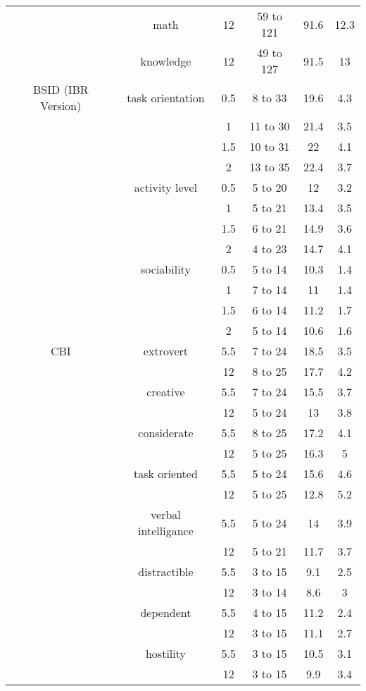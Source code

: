 \begin{ThreePartTable}
\begin{longtable}{c c c c c c}
        & math & 12 & 59 to 121 & 91.6 & 12.3 \\
        & knowledge & 12 & 49 to 127 & 91.5 & 13 \\
      \midrule
        BSID (IBR Version) & task orientation & 0.5 & 8 to 33 & 19.6 & 4.3 \\
        & & 1 & 11 to 30 & 21.4 & 3.5 \\
        & & 1.5 & 10 to 31 & 22 & 4.1 \\
        & & 2 & 13 to 35 & 22.4 & 3.7 \\
        & activity level & 0.5 & 5 to 20 & 12 & 3.2 \\
        & & 1 & 5 to 21 & 13.4 & 3.5 \\
        & & 1.5 & 6 to 21 & 14.9 & 3.6 \\
        & & 2 & 4 to 23 & 14.7 & 4.1 \\
        & sociability & 0.5 & 5 to 14 & 10.3 & 1.4 \\
        & & 1 & 7 to 14 & 11 & 1.4 \\
        & & 1.5 & 6 to 14 & 11.2 & 1.7 \\
        & & 2 & 5 to 14 & 10.6 & 1.6 \\
      \midrule
        CBI & extrovert & 5.5 & 7 to 24 & 18.5 & 3.5 \\
        & & 12 & 8 to 25 & 17.7 & 4.2 \\
        & creative & 5.5 & 7 to 24 & 15.5 & 3.7 \\
        & & 12 & 5 to 24 & 13 & 3.8 \\
        & considerate & 5.5 & 8 to 25 & 17.2 & 4.1 \\
        & & 12 & 5 to 25 & 16.3 & 5 \\
        & task oriented & 5.5 & 5 to 24 & 15.6 & 4.6 \\
        & & 12 & 5 to 25 & 12.8 & 5.2 \\
        & verbal intelligance & 5.5 & 5 to 24 & 14 & 3.9 \\
        & & 12 & 5 to 21 & 11.7 & 3.7 \\
        & distractible & 5.5 & 3 to 15 & 9.1 & 2.5 \\
        & & 12 & 3 to 14 & 8.6 & 3 \\
        & dependent & 5.5 & 4 to 15 & 11.2 & 2.4 \\
        & & 12 & 3 to 15 & 11.1 & 2.7 \\
        & hostility & 5.5 & 3 to 15 & 10.5 & 3.1 \\
        & & 12 & 3 to 15 & 9.9 & 3.4 \\

\end{longtable}
\end{ThreePartTable}
